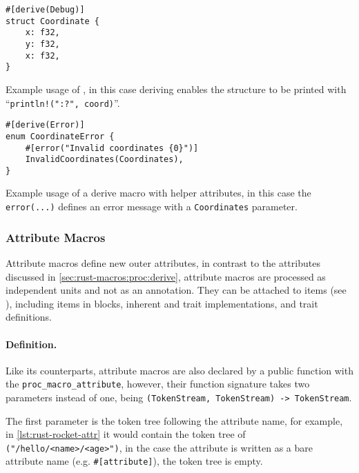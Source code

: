 \begin{listing}
    \centering
    \begin{verbatim}
#[derive(Debug)]
struct Coordinate {
    x: f32,
    y: f32,
    x: f32,
}
    \end{verbatim}
    \caption{
    Example usage of \keyword{\#[derive(...)]},
    in this case deriving  enables the structure to be printed with
    “\texttt{println!("{:?}", coord)}”.
    }
    \label{lst:rust-derive-debug}
\end{listing}

\begin{listing}
    \centering
    \begin{verbatim}
#[derive(Error)]
enum CoordinateError {
    #[error("Invalid coordinates {0}")]
    InvalidCoordinates(Coordinates),
}
    \end{verbatim}
    \caption{
        Example usage of a derive macro with helper attributes,
        in this case the \texttt{error(...)} defines an error message with a \texttt{Coordinates} parameter.
    }
    \label{lst:rust-derive-error}
\end{listing}

\subsubsection*{Attribute Macros}
Attribute macros define new outer attributes,
in contrast to the attributes discussed in \autoref{sec:rust-macros:proc:derive},
attribute macros are processed as independent units and not as an annotation.
They can be attached to items (see \autocite[Section 6]{RustRef2021}),
including items in  blocks, inherent and trait implementations, and trait definitions.

\paragraph{Definition.}
Like its counterparts, attribute macros are also declared by a public function with the \texttt{proc\_macro\_attribute},
however, their function signature takes two parameters instead of one, being \texttt{(TokenStream, TokenStream) -> TokenStream}.

The first parameter is the token tree following the attribute name, for example, in \autoref{lst:rust-rocket-attr}
it would contain the token tree of \texttt{("/hello/<name>/<age>")},
in the case the attribute is written as a bare attribute name (e.g. \texttt{\#[attribute]}),
the token tree is empty.

